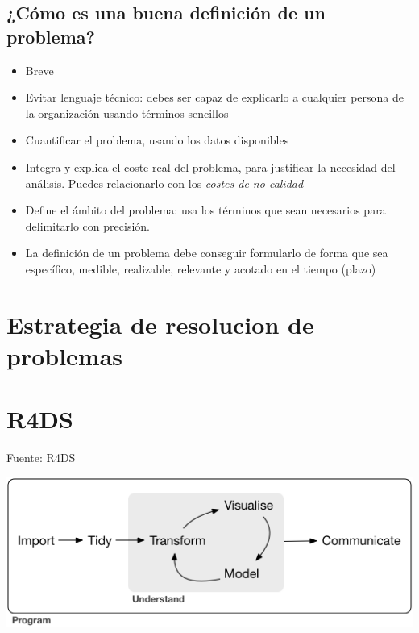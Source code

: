 \documentclass[
  letterpaper,
]{scrbook}
\providecommand{\tightlist}{%
  \setlength{\itemsep}{0pt}\setlength{\parskip}{0pt}}\usepackage{longtable,booktabs,array}
\begin{document}
\hypertarget{cuxf3mo-es-una-buena-definiciuxf3n-de-un-problema}{%
\subsection{¿Cómo es una buena definición de un
problema?}\label{cuxf3mo-es-una-buena-definiciuxf3n-de-un-problema}}

\begin{itemize}
\tightlist
\item
  Breve
\item
  Evitar lenguaje técnico: debes ser capaz de explicarlo a cualquier
  persona de la organización usando términos sencillos
\item
  Cuantificar el problema, usando los datos disponibles
\item
  Integra y explica el coste real del problema, para justificar la
  necesidad del análisis. Puedes relacionarlo con los \emph{costes de no
  calidad}
\item
  Define el ámbito del problema: usa los términos que sean necesarios
  para delimitarlo con precisión.
\item
  La definición de un problema debe conseguir formularlo de forma que
  sea específico, medible, realizable, relevante y acotado en el tiempo
  (plazo)
\end{itemize}

\hypertarget{estrategia-de-resolucion-de-problemas}{%
\section{Estrategia de resolucion de
problemas}\label{estrategia-de-resolucion-de-problemas}}

\hypertarget{r4ds}{%
\section{R4DS}\label{r4ds}}

Fuente: R4DS

\includegraphics{./01-imagenes/data-science.png}
\end{document}
